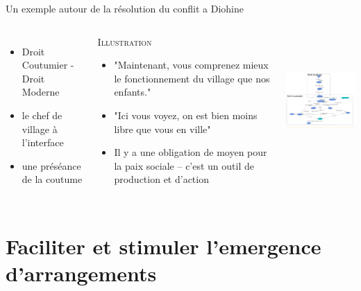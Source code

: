 \documentclass[newPxFont]{beamer}
\begin{document}
  \begin{frame}[c]{Un exemple autour de la résolution du conflit a Diohine}
      \vspace{-1cm}
      \begin{columns}[onlytextwidth,T]
        \column{\dimexpr\linewidth-30mm-5mm}
        \begin{itemize}
          \item Droit Coutumier - Droit Moderne  
          \item le chef de village à l'interface
          \item une préséance de la coutume
        \end{itemize}
        
        \small{
          \begin{exampleblock}{\textsc{Illustration}}
            \begin{itemize}
              \item "Maintenant, vous comprenez mieux le fonctionnement du village que nos enfants."
              \item "Ici vous voyez, on est bien moins libre que vous en ville"
              \item Il y a une obligation de moyen pour la paix sociale -- c'est un outil de production et d'action
            \end{itemize}
          \end{exampleblock}
        }
        \column{30mm}
        \vspace{1.5cm}
        \includegraphics[height=5cm]{img/zone_droit_conflits.png}
      \end{columns}
    \end{frame}


\section{Faciliter et stimuler l'emergence d'arrangements}
\end{document}
